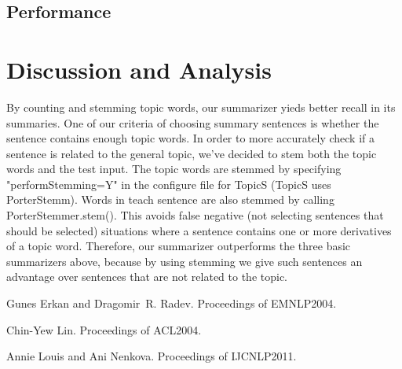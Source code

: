 \documentclass[11pt,letterpaper]{article}
\begin{document}
\subsection{Performance}

\section{Discussion and Analysis}

\noindent By counting and stemming topic words, our summarizer yieds better recall in its summaries. One of our criteria of choosing summary sentences is whether the sentence contains enough topic words. In order to more accurately check if a sentence is related to the general topic, we've decided to stem both the topic words and the test input. The topic words are stemmed by specifying "performStemming=Y" in the configure file for TopicS (TopicS uses PorterStemm). Words in teach sentence are also stemmed by calling PorterStemmer.stem(). This avoids false negative (not selecting sentences that should be selected) situations where a sentence contains one or more derivatives of a topic word. Therefore, our summarizer outperforms the three basic summarizers above, because by using stemming we give such sentences an advantage over sentences that are not related to the topic.
\begin{thebibliography}{}

Gunes Erkan and Dragomir~R. Radev.
\newblock Proceedings of EMNLP2004.

Chin-Yew Lin.
\newblock Proceedings of ACL2004.

Annie Louis and Ani Nenkova.
\newblock Proceedings of IJCNLP2011.

\end{thebibliography}
\end{document}
